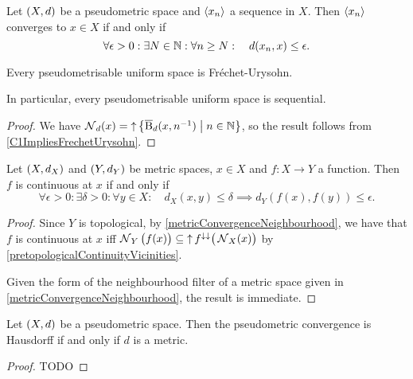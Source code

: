 \begin{corollary} \label{metricConvergenceSequence}
Let $\sSet{X,d}$ be a pseudometric space and $\left\langle x_n \right\rangle$ a sequence in $X$. Then $\left\langle x_n \right\rangle$ converges to $x\in X$ \textup{if and only if}
\[ \forall \epsilon>0: \exists N\in\mathbb{N}: \forall n\geq N: \quad d(x_n,x)\leq \epsilon. \]
\end{corollary}
\begin{corollary} \label{pseudometricSpaceFrechetUrysohn}
Every pseudometrisable uniform space is Fréchet-Urysohn.
\end{corollary}
In particular, every pseudometrisable uniform space is sequential.
\begin{proof}
We have $\neighbourhood_d(x) = \upset\setbuilder{\cball_d(x,n^{-1})}{n\in \N}$, so the result follows from \ref{C1ImpliesFrechetUrysohn}.
\end{proof}

\begin{lemma} \label{continuityMetricSpaces}
Let $\sSet{X, d_X}$ and $\sSet{Y, d_Y}$ be metric spaces, $x\in X$ and $f:X\to Y$ a function. Then $f$ is continuous at $x$ \textup{if and only if}
\[ \forall \epsilon >0: \exists \delta >0: \forall y\in X: \quad d_X(x,y) \leq \delta \implies d_Y(f(x), f(y)) \leq \epsilon. \]
\end{lemma}
\begin{proof}
Since $Y$ is topological, by \ref{metricConvergenceNeighbourhood}, we have that $f$ is continuous at $x$ iff $\operatorname{\mathcal{N}}_{Y}\big(f(x)\big) \subseteq \operatorname{\uparrow} f^{\downarrow\downarrow}\big(\operatorname{\mathcal{N}}_X(x)\big)$ by \ref{pretopologicalContinuityVicinities}. 

Given the form of the neighbourhood filter of a metric space given in \ref{metricConvergenceNeighbourhood}, the result is immediate.
\end{proof}

\begin{proposition} \label{metricConvergenceHausdorff}
Let $\sSet{X,d}$ be a pseudometric space. Then the pseudometric convergence is Hausdorff \textup{if and only if} $d$ is a metric.
\end{proposition}
\begin{proof}
TODO
\end{proof}

